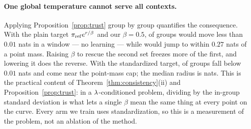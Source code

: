 \paragraph{One global temperature cannot serve all contexts.}
Applying Proposition~\ref{prop:trust} group by group quantifies the
consequence. With the plain target $\pi_{\mathrm{ref}} e^{r/\beta}$ and our
$\beta = 0.5$, \sPlainStuck{} of groups would move less than $0.01$ nats in a
window --- no learning --- while \sPlainCollapse{} would jump to within
$0.27$ nats of a point mass. Raising $\beta$ to rescue the second set freezes more
of the first, and lowering it does the reverse. With the standardized target,
\sStdStuck{} of groups fall below $0.01$ nats and \sStdCollapse{} come near the
point-mass cap; the median radius is \sStdMedKL{} nats. This is the practical
content of Theorem~\ref{thm:consistency}(ii) and Proposition~\ref{prop:trust}:
in a $\lambda$-conditioned problem, dividing by the in-group standard deviation is
what lets a single $\beta$ mean the same thing at every point on the curve.
Every \rrebel{} arm we train uses standardization, so this is a measurement of
the problem, not an ablation of the method.


